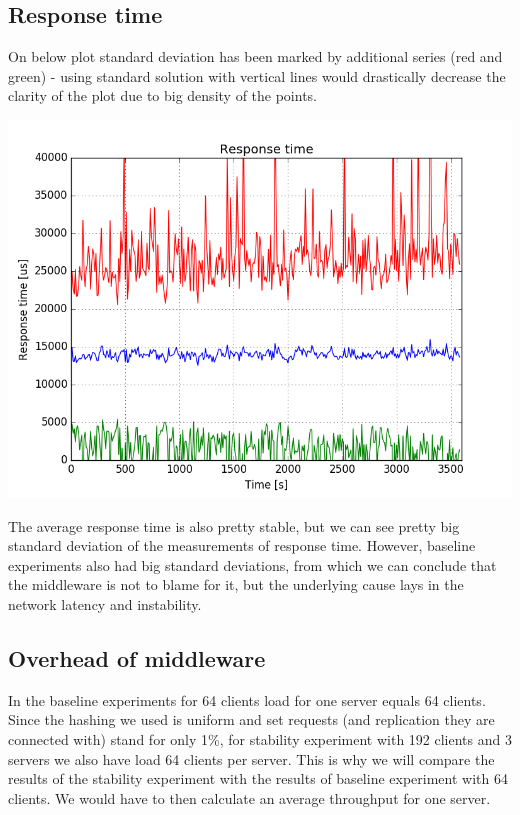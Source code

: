 \documentclass[11pt]{article}
\begin{document}
\subsection{Response time}

On below plot standard deviation has been marked by additional series (red and green) - using standard solution with vertical lines would drastically decrease the clarity of the plot due to big density of the points.

\includegraphics[scale=0.7]{stability_response_time.png}

The average response time is also pretty stable, but we can see pretty big standard deviation of the measurements of response time. However, baseline experiments also had big standard deviations, from which we can conclude that the middleware is not to blame for it, but the underlying cause lays in the network latency and instability.

\subsection{Overhead of middleware}

In the baseline experiments for 64 clients load for one server equals 64 clients. Since the hashing we used is uniform and set requests (and replication they are connected with) stand for only 1\%, for stability experiment with 192 clients and 3 servers we also have load 64 clients per server.  This is why we will compare the results of the stability experiment with the results of baseline experiment with 64 clients. We would have to then calculate an average throughput for one server.
\end{document}

